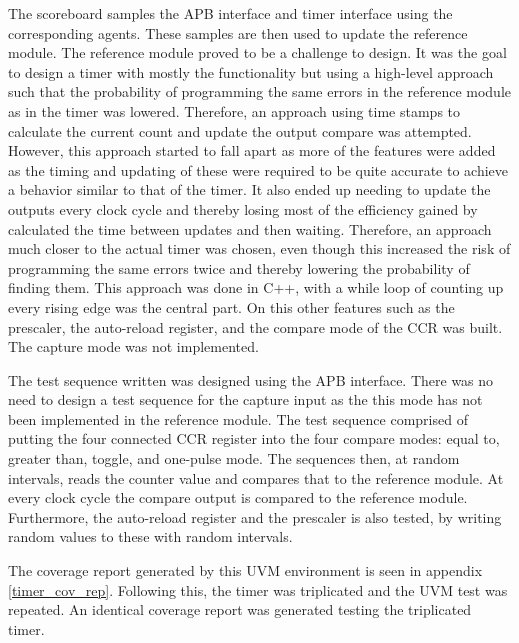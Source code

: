 \documentclass[./dissertation.tex]{subfiles}
\begin{document}
The scoreboard samples the APB interface and timer interface using the corresponding agents. These samples are then used to update the reference module. The reference module proved to be a challenge to design. It was the goal to design a timer with mostly the functionality but using a high-level approach such that the probability of programming the same errors in the reference module as in the timer was lowered. Therefore, an approach using time stamps to calculate the current count and update the output compare was attempted. However, this approach started to fall apart as more of the features were added as the timing and updating of these were required to be quite accurate to achieve a behavior similar to that of the timer. It also ended up needing to update the outputs every clock cycle and thereby losing most of the efficiency gained by calculated the time between updates and then waiting. Therefore, an approach much closer to the actual timer was chosen, even though this increased the risk of programming the same errors twice and thereby lowering the probability of finding them. This approach was done in C++, with a while loop of counting up every rising edge was the central part. On this other features such as the prescaler, the auto-reload register, and the compare mode of the CCR was built. The capture mode was not implemented. 

The test sequence written was designed using the APB interface. There was no need to design a test sequence for the capture input as the this mode has not been implemented in the reference module. The test sequence comprised of putting the four connected CCR register into the four compare modes: equal to, greater than, toggle, and one-pulse mode. The sequences then, at random intervals, reads the counter value and compares that to the reference module. At every clock cycle the compare output is compared to the reference module. Furthermore, the auto-reload register and the prescaler is also tested, by writing random values to these with random intervals. 

The coverage report generated by this UVM environment is seen in appendix \ref{timer_cov_rep}. Following this, the timer was triplicated and the UVM test was repeated. An identical coverage report was generated testing the triplicated timer. 




\end{document}
